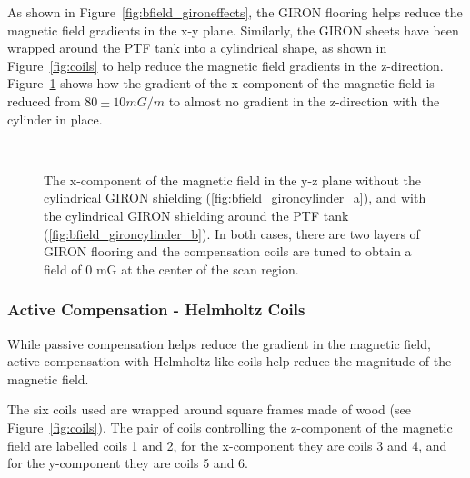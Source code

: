 As shown in Figure~\ref{fig:bfield_gironeffects}, the GIRON flooring helps reduce the magnetic field gradients in the x-y plane. Similarly, the GIRON sheets have been wrapped around the PTF tank into a cylindrical shape, as shown in Figure~\ref{fig:coils} to help reduce the magnetic field gradients in the z-direction. Figure~\ref{fig:bfield_gironcylinder} shows how the gradient of the x-component of the magnetic field is reduced from $ 80\pm10 mG/m $ to almost no gradient in the z-direction with the cylinder in place.
%
\begin{figure}[htbp]
  \begin{center}
    \\
    \vspace{-3 mm}
  \caption{The x-component of the magnetic field in the y-z plane without the cylindrical GIRON shielding (\ref{fig:bfield_gironcylinder_a}), and with the cylindrical GIRON shielding around the PTF tank (\ref{fig:bfield_gironcylinder_b}). In both cases, there are two layers of GIRON flooring and the compensation coils are tuned to obtain a field of 0 mG at the center of the scan region.}
  \label{fig:bfield_gironcylinder}
  \end{center}
\end{figure}
%

\subsubsection{Active Compensation - Helmholtz Coils}

While passive compensation helps reduce the gradient in the magnetic field, active compensation with Helmholtz-like coils help reduce the magnitude of the magnetic field.

The six coils used are wrapped around square frames made of wood (see Figure~\ref{fig:coils}). The pair of coils controlling the z-component of the magnetic field are labelled coils 1 and 2, for the x-component they are coils 3 and 4, and for the y-component they are coils 5 and 6.

